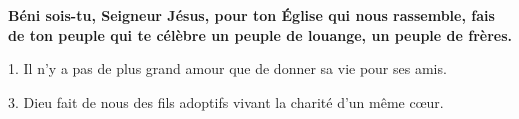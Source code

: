 \textbf{
Béni sois-tu, Seigneur Jésus,
pour ton Église qui nous rassemble,
fais de ton peuple qui te célèbre
un peuple de louange,
un peuple de frères.
}

1.
Il n’y a pas de plus grand amour
que de donner sa vie pour ses amis.

%
3.
Dieu fait de nous des fils adoptifs
vivant la charité d’un même cœur.
%
